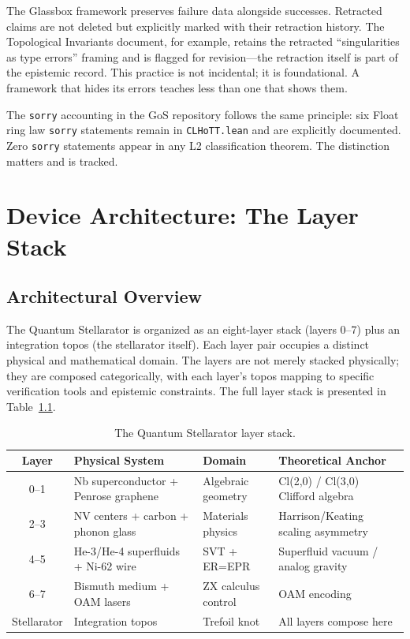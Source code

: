 \documentclass[12pt,letterpaper]{report}
\begin{document}
The Glassbox framework preserves failure data alongside successes. Retracted claims are not deleted but explicitly marked with their retraction history. The Topological Invariants document, for example, retains the retracted ``singularities as type errors'' framing and is flagged for revision---the retraction itself is part of the epistemic record. This practice is not incidental; it is foundational. A framework that hides its errors teaches less than one that shows them.

The \texttt{sorry} accounting in the GoS repository follows the same principle: six Float ring law \texttt{sorry} statements remain in \texttt{CLHoTT.lean} and are explicitly documented. Zero \texttt{sorry} statements appear in any L2 classification theorem. The distinction matters and is tracked.



\chapter{Device Architecture: The Layer Stack}

\section{Architectural Overview}

The Quantum Stellarator is organized as an eight-layer stack (layers 0--7) plus an integration topos (the stellarator itself). Each layer pair occupies a distinct physical and mathematical domain. The layers are not merely stacked physically; they are composed categorically, with each layer's topos mapping to specific verification tools and epistemic constraints. The full layer stack is presented in Table~\ref{tab:layers}.

\begin{table}[ht]
\centering
\caption{The Quantum Stellarator layer stack.}
\label{tab:layers}
\small
\begin{tabularx}{\textwidth}{c l l X}
\toprule
\textbf{Layer} & \textbf{Physical System} & \textbf{Domain} & \textbf{Theoretical Anchor} \\
\midrule
\rowcolor{demonstrated}
0--1 & Nb superconductor + Penrose graphene & Algebraic geometry & Cl(2,0) / Cl(3,0) Clifford algebra \\
\rowcolor{demonstrated}
2--3 & NV centers + carbon + phonon glass & Materials physics & Harrison/Keating scaling asymmetry \\
\rowcolor{conjectured}
4--5 & He-3/He-4 superfluids + Ni-62 wire & SVT + ER=EPR & Superfluid vacuum / analog gravity \\
\rowcolor{motivated}
6--7 & Bismuth medium + OAM lasers & ZX calculus control & OAM encoding \\
\rowcolor{conjectured}
Stellarator & Integration topos & Trefoil knot & All layers compose here \\
\bottomrule
\end{tabularx}
\end{table}
\end{document}
